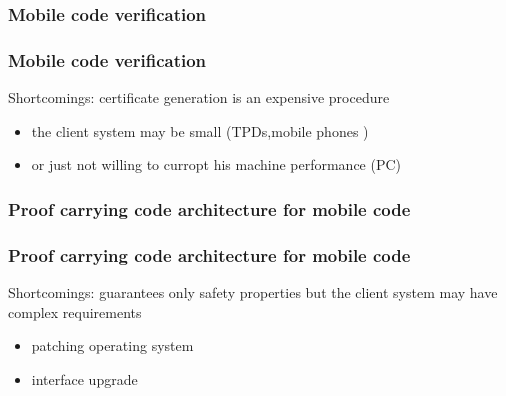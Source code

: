 \documentclass{beamer}
\begin{document}





\begin{frame}[shrink]
\frametitle{Mobile code verification}
\begin{figure}[hc]
\begin{center}
\end{center}
\end{figure}
\end{frame}

\begin{frame}[shrink]
\frametitle{Mobile code verification}  
Shortcomings: certificate generation is an expensive procedure
 \begin{itemize}
     \item the client system may be small (TPDs,mobile phones )
      \item or just not willing to curropt his machine performance (PC)  
 \end{itemize}
\end{frame}


\begin{frame}[shrink]
\frametitle{Proof carrying code architecture for mobile code}
\begin{figure}[hc]
\begin{center}
\end{center}
\end{figure}
\end{frame}

\begin{frame}[shrink]
\frametitle{Proof carrying code architecture for mobile code}
Shortcomings: guarantees only safety properties but
 the client system may have complex requirements
 \begin{itemize}
     \item patching operating system 
      \item  interface upgrade
 \end{itemize}
\end{frame}
\end{document}
